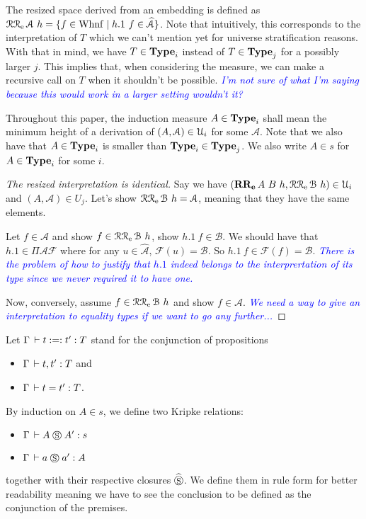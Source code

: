 \documentclass[a4paper,english]{lipics-utf8x}
\newcommand\meta[1]{\noindent\textcolor{blue}{\emph{#1}}}
\begin{document}
  The resized space derived from an embedding is defined as
  $\operatorname{\mathcal{R}\mathcal{R}_e} \mathcal{A}\ h = \{ f \in \operatorname{Whnf} \mid h.1~f \in \widehat{\mathcal{A}}
  \}$.
  Note that intuitively, this corresponds to the interpretation of $T$
  which we can't mention yet for universe stratification reasons.
  With that in mind, we have $T \in \operatorname{\mathbf{Type}}_i$ instead of $T \in \operatorname{\mathbf{Type}}_j$ for
  a possibly larger $j$. This implies that, when considering the measure,
  we can make a recursive call on $T$ when it shouldn't be possible.
  \meta{I'm not sure of what I'm saying because this would work in a larger
  setting wouldn't it?}

  Throughout this paper, the induction measure $A \in \operatorname{\mathbf{Type}}_i$ shall mean the
  minimum height of a derivation of $(A, \mathcal{A}) \in \mathcal{U}_i$ for some
  $\mathcal{A}$. Note that we also have that $A \in \operatorname{\mathbf{Type}}_i$ is smaller
  than $\operatorname{\mathbf{Type}}_i \in \operatorname{\mathbf{Type}}_j$.
  We also write $A \in s$ for $A \in \operatorname{\mathbf{Type}}_i$ for some $i$.

  \begin{proof}[The resized interpretation is identical]
    Say we have $(\operatorname{\mathbf{RR_e}}A\ B\ h, \operatorname{\mathcal{R}\mathcal{R}_e} \mathcal{B}\ h) \in \mathcal{U}_i$
    and $(A, \mathcal{A}) \in U_j$.
    Let's show $\operatorname{\mathcal{R}\mathcal{R}_e} \mathcal{B}\ h = \mathcal{A}$, meaning that they
    have the same elements.

    Let $f \in \mathcal{A}$ and show $f \in \operatorname{\mathcal{R}\mathcal{R}_e} \mathcal{B}\ h$, \ie
    show $h.1~f \in \mathcal{B}$.
    We should have that $h.1 \in \Pi \mathcal{A} \mathcal{F}$ where for any
    $u \in \widehat{\mathcal{A}}$, $\mathcal{F}(u) = \mathcal{B}$.
    So $h.1~f \in \mathcal{F}(f) = \mathcal{B}$.
    \meta{There is the problem of how to justify that $h.1$ indeed belongs to
    the interprertation of its type since we never required it to have one.}

    Now, conversely, assume $f \in \operatorname{\mathcal{R}\mathcal{R}_e} \mathcal{B}\ h$ and show
    $f \in \mathcal{A}$.%
    \meta{We need a way to give an interpretation to equality types if we want
    to go any further...}
  \end{proof}


  Let $\Gamma \,\vdash t :=: t' : T$ stand for the conjunction of propositions
  \begin{itemize}
    \item $\Gamma \,\vdash t,t' : T$ and
    \item $\Gamma \,\vdash t = t' : T$.
  \end{itemize}
  By induction on $A \in s$, we define two Kripke relations:
  \begin{itemize}
    \item $\Gamma \,\vdash A \mathrel{\circledS} A' : s$
    \item $\Gamma \,\vdash a \mathrel{\circledS} a' : A$
  \end{itemize}
  together with their respective closures $\mathrel{\widehat{\mathrel{\circledS}}}$.
  We define them in rule form for better readability meaning we have to see the
  conclusion to be defined as the conjunction of the premises.
\end{document}
